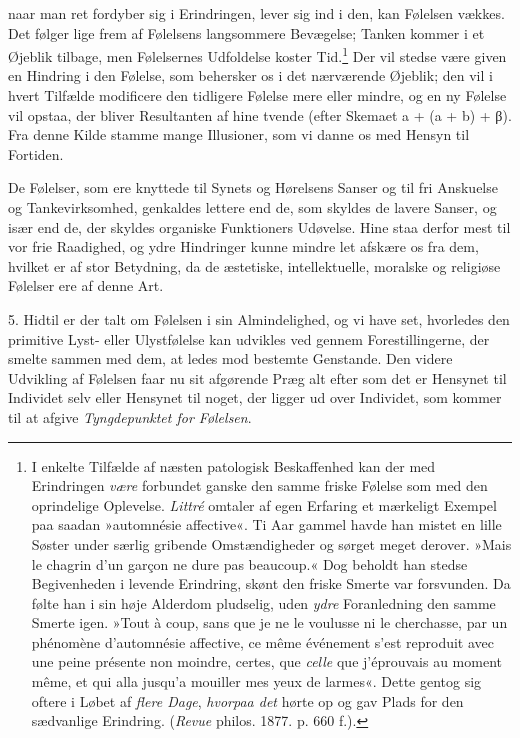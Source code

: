\documentclass[12pt,a4paper,openany]{book}
\newcommand{\opage}[1]{\marginnote{\footnotesize\textit{[#1]}}}
\begin{document}
naar man ret fordyber sig i Erindringen, lever sig ind i den, kan
Følelsen vækkes. Det følger lige frem af Følelsens langsommere
Bevægelse; Tanken kommer i et Øjeblik tilbage, men Følelsernes
Udfoldelse koster Tid.\footnote[2]{I enkelte Tilfælde af næsten
patologisk Beskaffenhed kan der med Erindringen \emph{være} forbundet
ganske den samme friske Følelse som med den oprindelige Oplevelse.
\emph{Littré} omtaler af egen Erfaring et mærkeligt Exempel paa saadan
»automnésie affective«. Ti Aar gammel havde han mistet en lille Søster
under særlig gribende Omstændigheder og sørget meget derover. »Mais le
chagrin d’un garçon ne dure pas beaucoup.« Dog beholdt han stedse
Begivenheden i levende Erindring, skønt den friske Smerte var
forsvunden. Da følte han i sin høje Alderdom pludselig, uden \emph{ydre}
Foranledning den samme Smerte igen. »Tout à coup, sans que je ne le
voulusse ni le cherchasse, par un phénomène d’automnésie affective, ce
même événement s’est reproduit avec une peine présente non moindre,
certes, que \emph{celle} que j’éprouvais au moment même, et qui alla
jusqu’a mouiller mes yeux de larmes«. Dette gentog sig oftere i Løbet af
\emph{flere Dage}, \emph{hvorpaa det} hørte op og gav Plads for den
sædvanlige Erindring. (\emph{Revue} philos. 1877. p. 660 f.).} Der vil
stedse være given en
\opage{292}Hindring i den Følelse, som behersker os i det nærværende
Øjeblik; den vil i hvert Tilfælde modificere den tidligere Følelse mere
eller mindre, og en ny Følelse vil opstaa, der bliver Resultanten af
hine tvende (efter Skemaet a + (a + b) + β). Fra denne Kilde stamme
mange Illusioner, som vi danne os med Hensyn til Fortiden.

De Følelser, som ere knyttede til Synets og Hørelsens Sanser og til fri
Anskuelse og Tankevirksomhed, genkaldes lettere end de, som skyldes de
lavere Sanser, og især end de, der skyldes organiske Funktioners
Udøvelse. Hine staa derfor mest til vor frie Raadighed, og ydre
Hindringer kunne mindre let afskære os fra dem, hvilket er af stor
Betydning, da de æstetiske, intellektuelle, moralske og religiøse
Følelser ere af denne Art.

5. Hidtil er der talt om Følelsen i sin Almindelighed, og vi have set,
hvorledes den primitive Lyst- eller Ulystfølelse kan udvikles ved gennem
Forestillingerne, der smelte sammen med dem, at ledes mod bestemte
Genstande. Den videre Udvikling af Følelsen faar nu sit afgørende Præg
alt efter som det er Hensynet til Individet selv eller Hensynet til
noget, der ligger ud over Individet, som kommer til at afgive
\emph{Tyngdepunktet for Følelsen}.
\end{document}
